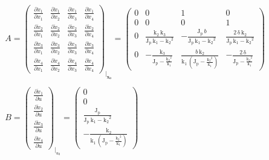 \documentclass[11pt,a4paper]{article}
\begin{document}
\renewcommand{\arraystretch}{1.3}
{\Large
\begin{align*}
&A = 
\begin{pmatrix}
\frac{\partial \dot{x}_1}{\partial x_1} & \frac{\partial \dot{x}_1}{\partial x_2} & \frac{\partial \dot{x}_1}{\partial x_3} & \frac{\partial \dot{x}_1}{\partial x_4}	\\
\frac{\partial \dot{x}_2}{\partial x_1} & \frac{\partial \dot{x}_2}{\partial x_2} & \frac{\partial \dot{x}_2}{\partial x_3} & \frac{\partial \dot{x}_2}{\partial x_4}	\\
\frac{\partial \dot{x}_3}{\partial x_1} & \frac{\partial \dot{x}_3}{\partial x_2} & \frac{\partial \dot{x}_3}{\partial x_3} & \frac{\partial \dot{x}_3}{\partial x_4}	\\
\frac{\partial \dot{x}_4}{\partial x_1} & \frac{\partial \dot{x}_4}{\partial x_2} & \frac{\partial \dot{x}_4}{\partial x_3} & \frac{\partial \dot{x}_4}{\partial x_4}
\end{pmatrix}_{\biggr\rvert_\mathbf{x_0}} =
\left(\begin{array}{cccc} 0 & 0 & 1 & 0\\ 0 & 0 & 0 & 1\\ 0 & \frac{\mathrm{k_2}\, \mathrm{k_3}}{\mathrm{J_p}\, \mathrm{k_1} - {\mathrm{k_2}}^2} & -\frac{\mathrm{J_p}\, b}{\mathrm{J_p}\, \mathrm{k_1} - {\mathrm{k_2}}^2} & \frac{2\, \mathrm{\delta}\, \mathrm{k_2}}{\mathrm{J_p}\, \mathrm{k_1} - {\mathrm{k_2}}^2}\\ 0 & -\frac{\mathrm{k_3}}{\mathrm{J_p} - \frac{{\mathrm{k_2}}^2}{\mathrm{k_1}}} & \frac{b\, \mathrm{k_2}}{\mathrm{k_1}\, \left(\mathrm{J_p} - \frac{{\mathrm{k_2}}^2}{\mathrm{k_1}}\right)} & -\frac{2\, \mathrm{\delta}}{\mathrm{J_p} - \frac{{\mathrm{k_2}}^2}{\mathrm{k_1}}} \end{array}\right)	\\ \\
&B =
\begin{pmatrix}
\frac{\partial \dot{x}_1}{\partial u}	\\
\frac{\partial \dot{x}_2}{\partial u}	\\
\frac{\partial \dot{x}_3}{\partial u}	\\
\frac{\partial \dot{x}_4}{\partial u}
\end{pmatrix}_{\biggr\rvert_{u_0}} =
\left(\begin{array}{c} 0\\ 0\\ \frac{\mathrm{J_p}}{\mathrm{J_p}\, \mathrm{k_1} - {\mathrm{k_2}}^2}\\ -\frac{\mathrm{k_2}}{\mathrm{k_1}\, \left(\mathrm{J_p} - \frac{{\mathrm{k_2}}^2}{\mathrm{k_1}}\right)} \end{array}\right)	\\ \\

\end{align*}}
\end{document}
